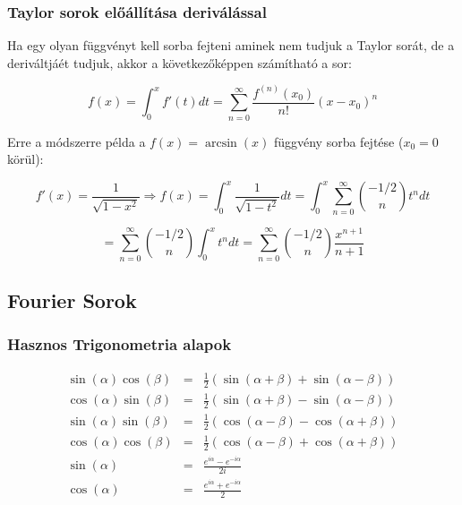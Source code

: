 \documentclass{article}
\begin{document}
\newpage

\subsubsection{Taylor sorok előállítása deriválással}

Ha egy olyan függvényt kell sorba fejteni aminek nem tudjuk a Taylor sorát, de a deriváltjáét tudjuk, akkor a következőképpen számítható a sor:

\begin{equation*}
    f(x) = \int_{0}^{x} f'(t) dt = \sum_{n=0}^{\infty} \frac{f^{(n)}(x_0)}{n!} (x - x_0)^n
\end{equation*}

Erre a módszerre példa a $f(x) = \arcsin(x)$ függvény sorba fejtése ($x_0=0$ körül):

\begin{equation*}
    f'(x) = \frac{1}{\sqrt{1-x^2}} \Rightarrow f(x) = \int_{0}^{x} \frac{1}{\sqrt{1-t^2}} dt = \int_{0}^{x} \sum_{n=0}^{\infty} \binom{-1/2}{n} t^n dt
\end{equation*}

\begin{equation*}
    = \sum_{n=0}^{\infty} \binom{-1/2}{n}  \int_{0}^{x} t^n dt =\sum_{n=0}^{\infty} \binom{-1/2}{n} \frac{x^{n+1}}{n+1}
\end{equation*}

\newpage

\subsection{Fourier Sorok}

\subsubsection{Hasznos Trigonometria alapok}
\begin{eqnarray*}
    \sin(\alpha)\cos(\beta) &=& \frac{1}{2} \left( \sin(\alpha + \beta) + \sin(\alpha - \beta) \right) \\
    \cos(\alpha)\sin(\beta) &=& \frac{1}{2} \left( \sin(\alpha + \beta) - \sin(\alpha - \beta) \right) \\
    \sin(\alpha)\sin(\beta) &=& \frac{1}{2} \left( \cos(\alpha - \beta) - \cos(\alpha + \beta) \right) \\
    \cos(\alpha)\cos(\beta) &=& \frac{1}{2} \left( \cos(\alpha - \beta) + \cos(\alpha + \beta) \right) \\
    \sin(\alpha) &=& \frac{e^{i\alpha} - e^{-i\alpha}}{2i} \\
    \cos(\alpha) &=& \frac{e^{i\alpha} + e^{-i\alpha}}{2}
\end{eqnarray*}
\end{document}
